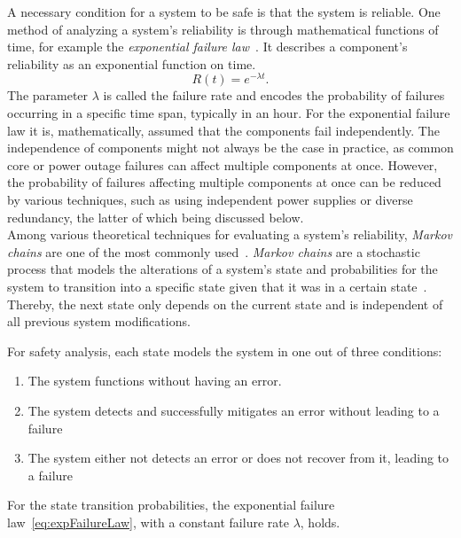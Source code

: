 A necessary condition for a system to be safe is that the system is reliable.
One method of analyzing a system's reliability is through mathematical functions of time, for example the \textit{exponential failure law}~\cite{GeffroyMotetDependableComputing}.
It describes a component's reliability as an exponential function on time.
\begin{equation}
R(t) = e^{-\lambda t}.
\label{eq:expFailureLaw}
\end{equation}
The parameter $\lambda$ is called the failure rate and encodes the probability of failures occurring in a specific time span, typically in an hour.
For the exponential failure law it is, mathematically, assumed that the components fail independently.
The independence of components might not always be the case in practice, as common core or power outage failures can affect multiple components at once.
However, the probability of failures affecting multiple components at once can be reduced by various techniques, such as using independent power supplies or diverse redundancy, the latter of which being discussed below.
\\

Among various theoretical techniques for evaluating a system's reliability, \textit{Markov chains} are one of the most commonly used~\cite{BarryFaultToleranceAnalysis}.
\textit{Markov chains} are a stochastic process that models the alterations of a system's state and probabilities for the system to transition into a specific state given that it was in a certain state~\cite{KemenyMarkovChains}.
Thereby, the next state only depends on the current state and is independent of all previous system modifications.

For safety analysis, each state models the system in one out of three conditions:
\begin{enumerate}
\item The system functions without having an error.
\item The system detects and successfully mitigates an error without leading to a failure
\item The system either not detects an error or does not recover from it, leading to a failure
\end{enumerate}

For the state transition probabilities, the exponential failure law~\autoref{eq:expFailureLaw}, with a constant failure rate $\lambda$, holds.

